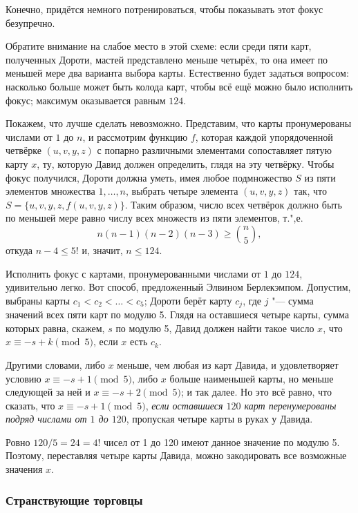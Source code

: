 \documentclass[twoside]{book}
\begin{document}
Конечно, придётся немного потренироваться, чтобы показывать этот фокус безупречно.

\medskip

Обратите внимание на слабое место в этой схеме: если среди пяти карт, полученных Дороти, мастей представлено меньше четырёх, то она имеет по меньшей мере два варианта выбора карты.
Естественно будет задаться вопросом: насколько больше может быть колода карт, чтобы всё ещё можно было исполнить фокус;
максимум оказывается равным $124$.

Покажем, что лучше сделать невозможно.  Представим, что карты
пронумерованы числами от $1$ до $n$, и
рассмотрим функцию $f$, которая каждой упорядоченной четвёрке
$(u,v,y,z)$ с попарно различными элементами сопоставляет пятую карту
$x$, ту, которую Давид должен определить, глядя на эту четвёрку.
Чтобы фокус получился, Дороти должна уметь, имея любое
подмножество $S$ из пяти элементов множества
${1, \dots, n}$, выбрать четыре элемента $(u,v,y,z)$ так, что
$S = \{u,v,y,z, f(u,v,y,z)\}$.  Таким образом, число всех четвёрок
должно быть по меньшей мере равно числу всех
множеств из пяти элементов, т.",е.
\[n(n - 1)(n - 2)(n - 3)\ge \binom n5,\]
откуда $n - 4 \le5!$ и, значит, $n\le 124$.


Исполнить фокус с картами, пронумерованными числами от $1$
до $124$, удивительно легко.  Вот способ, предложенный Элвином
Берлекэмпом.
Допустим, выбраны карты $c_1 < c_2 < \ldots < c_5$;
Дороти берёт карту $c_j$, где $j$ "--- сумма значений всех пяти карт
по модулю 5.
Глядя на оставшиеся четыре карты, сумма которых равна, скажем, $s$ по модулю 5, Давид должен найти такое число
$x$, что $x\equiv -s + k \pmod 5$, если $x$ есть
$c_k$.

Другими словами, либо $x$ меньше, чем любая из карт Давида, и
удовлетворяет условию $x\equiv-s + 1 \pmod 5$, либо $x$ больше наименьшей
карты, но меньше следующей за ней и $x\equiv -s + 2 \pmod 5$; и так
далее.  Но это всё равно, что сказать, что $x\equiv -s + 1 \pmod 5$,
\emph{если оставшиеся $120$ карт перенумерованы подряд числами от $1$ до $120$}, пропуская четыре карты в руках
у Давида.

Ровно $120/5 = 24 = 4!$ чисел от 1 до 120 имеют данное значение по модулю 5.
Поэтому, переставляя четыре карты Давида, можно закодировать все возможные значения $x$.
\heart

\subsubsection*{Странствующие торговцы} %
\end{document}
